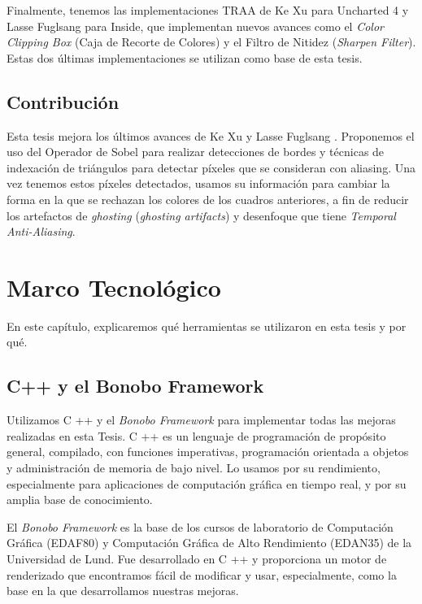 \documentclass[pregrado]{tesis-usb} %
\begin{document}
Finalmente, tenemos las implementaciones TRAA de Ke Xu para Uncharted 4 y Lasse Fuglsang para Inside, que implementan nuevos avances como el \textit{Color Clipping Box} (Caja de Recorte de Colores) y el Filtro de Nitidez (\textit{Sharpen Filter}). Estas dos últimas implementaciones se utilizan como base de esta tesis. \cite{Fuglsand2016, XU2016}


\section{Contribución}
Esta tesis mejora los últimos avances de Ke Xu y Lasse Fuglsang \cite{Fuglsand2016, XU2016}. Proponemos el uso del Operador de Sobel para realizar detecciones de bordes y técnicas de indexación de triángulos para detectar píxeles que se consideran con aliasing. Una vez tenemos estos píxeles detectados, usamos su información para cambiar la forma en la que se rechazan los colores de los cuadros anteriores, a fin de reducir los artefactos de \textit{ghosting} (\textit{ghosting artifacts})  y desenfoque que tiene \textit{Temporal Anti-Aliasing}.

\chapter{Marco Tecnológico}
En este capítulo, explicaremos qué herramientas se utilizaron en esta tesis y por qué.

\section{C++ y el Bonobo Framework}
Utilizamos C ++ y el \textit{Bonobo Framework} para implementar todas las mejoras realizadas en esta Tesis. C ++ es un lenguaje de programación de propósito general, compilado, con funciones imperativas, programación orientada a objetos y administración de memoria de bajo nivel. Lo usamos por su rendimiento, especialmente para aplicaciones de computación gráfica en tiempo real, y por su amplia base de conocimiento.

El \textit{Bonobo Framework} es la base de los cursos de laboratorio de Computación Gráfica (EDAF80) y Computación Gráfica de Alto Rendimiento (EDAN35) de la Universidad de Lund. Fue desarrollado en C ++ y proporciona un motor de renderizado que encontramos fácil de modificar y usar, especialmente, como la base en la que desarrollamos nuestras mejoras.
\end{document}
